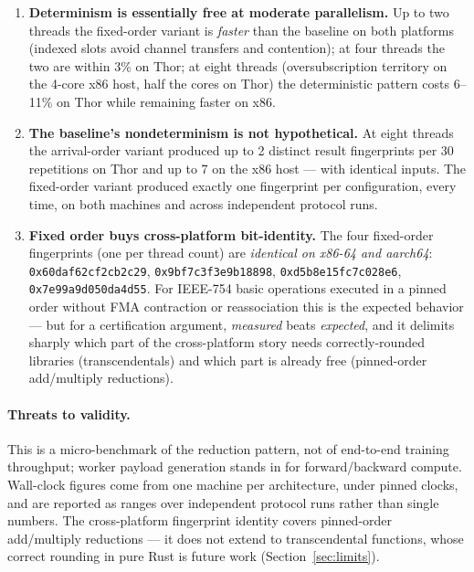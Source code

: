 \documentclass[sigconf,review]{acmart}
\begin{document}
\begin{enumerate}
  \item \textbf{Determinism is essentially free at moderate parallelism.}
    Up to two threads the fixed-order variant is \emph{faster} than the
    baseline on both platforms (indexed slots avoid channel transfers and
    contention); at four threads the two are within 3\% on Thor; at eight
    threads (oversubscription territory on the 4-core x86 host, half the
    cores on Thor) the deterministic pattern costs 6--11\% on Thor while
    remaining faster on x86.
  \item \textbf{The baseline's nondeterminism is not hypothetical.} At
    eight threads the arrival-order variant produced up to 2 distinct
    result fingerprints per 30 repetitions on Thor and up to 7 on the x86
    host --- with identical inputs. The fixed-order variant produced
    exactly one fingerprint per configuration, every time, on both
    machines and across independent protocol runs.
  \item \textbf{Fixed order buys cross-platform bit-identity.} The four
    fixed-order fingerprints (one per thread count) are \emph{identical on
    x86-64 and aarch64}: \texttt{0x60daf62cf2cb2c29},
    \texttt{0x9bf7c3f3e9b18898}, \texttt{0xd5b8e15fc7c028e6},
    \texttt{0x7e99a9d050da4d55}. For IEEE-754 basic operations executed in
    a pinned order without FMA contraction or reassociation this is the
    expected behavior --- but for a certification argument, \emph{measured}
    beats \emph{expected}, and it delimits sharply which part of the
    cross-platform story needs correctly-rounded libraries
    (transcendentals) and which part is already free (pinned-order
    add/multiply reductions).
\end{enumerate}

\paragraph{Threats to validity.}
This is a micro-benchmark of the reduction pattern, not of end-to-end
training throughput; worker payload generation stands in for
forward/backward compute. Wall-clock figures come from one machine per
architecture, under pinned clocks, and are reported as ranges over
independent protocol runs rather than single numbers. The cross-platform
fingerprint identity covers pinned-order add/multiply reductions --- it
does not extend to transcendental functions, whose correct rounding in
pure Rust is future work (Section~\ref{sec:limits}).
\end{document}
